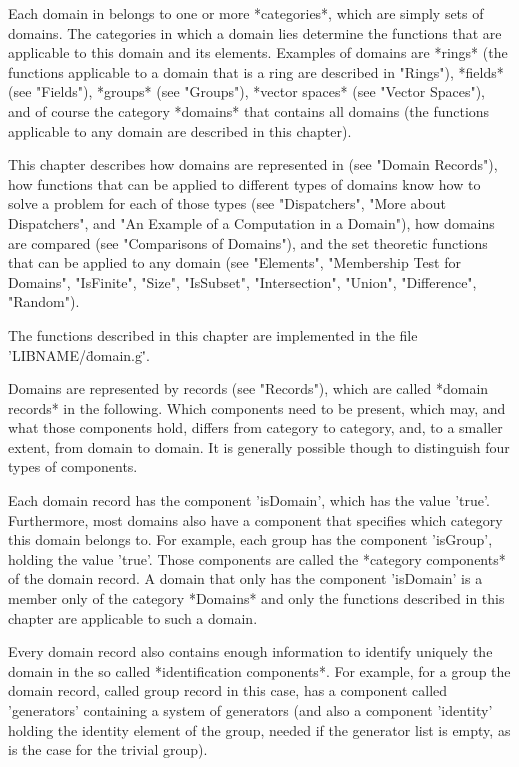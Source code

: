 Each domain  in  {\GAP} belongs to one  or  more *categories*, which  are
simply sets of domains.  The categories in  which a domain lies determine
the functions  that  are  applicable to   this  domain and  its elements.
Examples  of domains are *rings*  (the  functions applicable to a  domain
that  is a  ring  are  described in "Rings"),  *fields*   (see "Fields"),
*groups*  (see "Groups"), *vector spaces*  (see "Vector  Spaces"), and of
course  the category *domains* that   contains all domains (the functions
applicable to any domain are described in this chapter).

This chapter describes how domains are represented in {\GAP} (see "Domain
Records"),  how functions that  can be  applied  to  different  types  of
domains know how  to  solve a  problem  for  each  of  those  types  (see
"Dispatchers", "More about Dispatchers", and "An Example of a Computation
in a Domain"), how domains are compared (see  "Comparisons of  Domains"),
and  the set theoretic  functions that can be  applied to any domain (see
"Elements",   "Membership   Test  for   Domains",   "IsFinite",   "Size",
"IsSubset", "Intersection", "Union", "Difference", "Random").

The  functions  described in this  chapter  are implemented in  the  file
'LIBNAME/\"domain.g\"'.


Domains are represented by    records (see "Records"), which  are  called
*domain records* in the following.  Which  components need to be present,
which  may, and what   those components hold,  differs  from  category to
category, and,  to a smaller   extent, from  domain  to domain.   It   is
generally possible though to distinguish four types of components.

Each  domain record  has  the component 'isDomain',  which  has the value
'true'.  Furthermore,  most domains also have  a component that specifies
which category this  domain belongs to.  For  example, each group has the
component 'isGroup', holding the   value  'true'.  Those components   are
called  the *category  components* of  the  domain record.  A domain that
only has  the  component  'isDomain' is  a  member  only of the  category
*Domains* and only the functions described in this chapter are applicable
to such a domain.

Every domain record also contains enough information to identify uniquely
the domain in the   so called *identification components*.   For example,
for a  group the domain record,  called group record  in this case, has a
component called 'generators' containing a system of generators (and also
a component 'identity' holding the identity element  of the group, needed
if the generator list is empty, as is the case for the trivial group).

